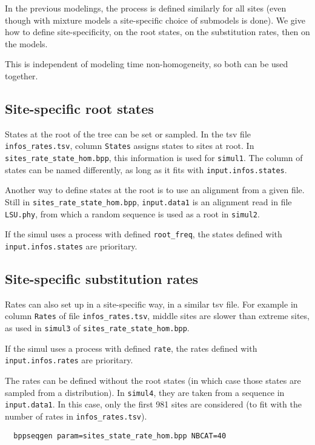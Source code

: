 \documentclass{article}
\begin{document}
In the previous modelings, the process is defined similarly for all
sites (even though with mixture models a site-specific choice of
submodels is done). We give how to define site-specificity, on the
root states, on the substitution rates, then on the models.

This is independent of modeling time non-homogeneity, so both can be
used together. 


\subsection{Site-specific root states}

States at the root of the tree can be set or sampled. In the tsv file
\verb|infos_rates.tsv|, column \texttt{States} assigns states to sites
at root. In \verb|sites_rate_state_hom.bpp|, this information is used
for \texttt{simul1}. The column of states can be named differently, as
long as it fits with \texttt{input.infos.states}.


Another way to define states at the root is to use an alignment from a
given file. Still in \verb|sites_rate_state_hom.bpp|,
\texttt{input.data1} is an alignment read in file \texttt{LSU.phy},
from which a random sequence is used as a root in \texttt{simul2}.


If the simul uses a process with defined \verb|root_freq|, the states
defined with \texttt{input.infos.states} are prioritary.


\subsection{Site-specific substitution rates}

Rates can also set up in a site-specific way, in a similar tsv file.
For example in column \texttt{Rates} of file \verb|infos_rates.tsv|,
middle sites are slower than extreme sites, as used in \texttt{simul3}
of \verb|sites_rate_state_hom.bpp|.

If the simul uses a process with defined \verb|rate|, the rates
defined with \texttt{input.infos.rates} are prioritary.


The rates can be defined without the root states (in which case those
states are sampled from a distribution). In \texttt{simul4}, they are
taken from a sequence in \texttt{input.data1}. In this case, only the
first 981 sites are considered (to fit with the number of rates in
\verb|infos_rates.tsv|). 


\begin{verbatim}
  bppseqgen param=sites_state_rate_hom.bpp NBCAT=40
\end{verbatim}
\end{document}
